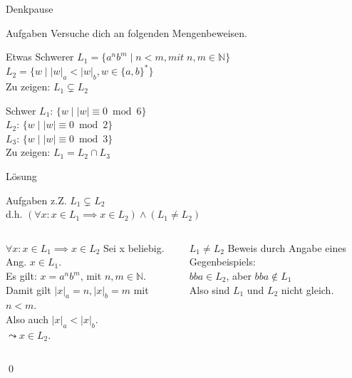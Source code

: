 {
\begin{frame}[fragile]{Denkpause}
    \begin{alertblock}{Aufgaben}
    Versuche dich an folgenden Mengenbeweisen.
    \end{alertblock}
    
    \begin{block}{Etwas Schwerer}
    $L_1=\{a^{n}b^{m} \mid n<m ,mit \; n,m\in \mathbb{N}\}$\\
    $L_2=\{w \mid |w|_a < |w|_b, w \in \{a,b\}^*\}$\\
    \vspace{0.3cm}
    Zu zeigen: $L_1 \subsetneq L_2$
    \end{block}
    \begin{block}{Schwer}
    $L_1$: $\{w\mid |w|\equiv 0 \bmod 6\}$\\
    $L_2$: $\{w\mid |w|\equiv 0 \bmod 2\}$\\
    $L_3$: $\{w\mid |w|\equiv 0 \bmod 3\}$\\
    \vspace{0.3cm}
    Zu zeigen: $L_1 = L_2 \cap L_3$
    \end{block}
\end{frame}
}

{
\begin{frame}[fragile]{Lösung}
    \begin{alertblock}{Aufgaben}
    z.Z. $L_1 \subsetneq L_2$\\
    d.h. $(\forall x: x \in L_1 \implies x \in L_2) \wedge (L_1 \neq L_2)$
    \end{alertblock}
    
    \begin{columns}
    \begin{alertblock}{$\forall x: x \in L_1 \implies x \in L_2$}
        Sei x beliebig. Ang. $x \in L_1$.\\
        Es gilt: $x=a^{n}b^{m}$, mit $n,m\in\mathbb{N}$.\\
        Damit gilt $|x|_a=n, |x|_b=m$ mit $n<m$.\\
        Also auch $|x|_a < |x|_b$.\\
        $\leadsto x \in L_2$.
    \end{alertblock}
    
    \begin{alertblock}{$L_1 \neq L_2$}
        Beweis durch Angabe eines Gegenbeispiels:\\
        $bba \in L_2$, aber $bba \notin L_1$\\
        Also sind $L_1$ und $L_2$ nicht gleich.
    \end{alertblock}
    \end{columns}
    \qed
\end{frame}
}

